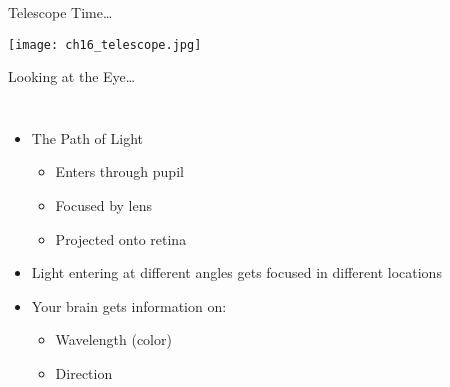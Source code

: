 \documentclass[pdf, aspectratio=169]{beamer}
\begin{document}

\begin{frame}{Telescope Time\ldots}
  \begin{center}
	\texttt{[image: ch16\_telescope.jpg]}
  \end{center}
\end{frame}

\begin{frame}{Looking at the Eye\ldots}
  \begin{columns}
	\begin{itemize}
	  \item The Path of Light
		\begin{itemize}
		  \item Enters through pupil
		  \item Focused by lens
		  \item Projected onto retina
		\end{itemize}
	  \item Light entering at different angles gets focused in different locations
	  \item Your brain gets information on:
		\begin{itemize}
		  \item Wavelength (color)
		  \item Direction
		\end{itemize}
	\end{itemize}
	\begin{center}
	\end{center}
  \end{columns}
\end{frame}
\end{document}
